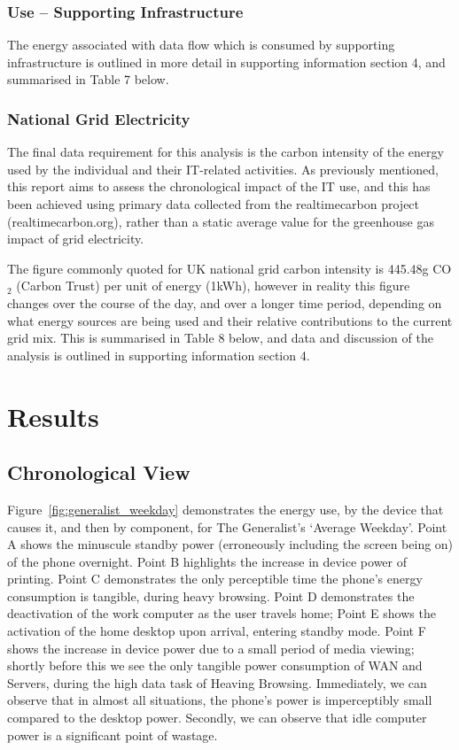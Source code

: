 \documentclass[conference]{IEEEtran}
\begin{document}
\subsubsection{Use -- Supporting Infrastructure}

The energy associated with data flow which is consumed by supporting
infrastructure is outlined in more detail in supporting information
section 4, and summarised in Table 7 below.

\subsubsection{National Grid Electricity}

The final data requirement for this analysis is the carbon intensity
of the energy used by the individual and their IT-related
activities. As previously mentioned, this report aims to assess the
chronological impact of the IT use, and this has been achieved using
primary data collected from the realtimecarbon project
(realtimecarbon.org), rather than a static average value for the
greenhouse gas impact of grid electricity.

The figure commonly quoted for UK national grid carbon intensity is
445.48g CO$_2$ (Carbon Trust) per unit of energy (1kWh), however in
reality this figure changes over the course of the day, and over a
longer time period, depending on what energy sources are being used
and their relative contributions to the current grid mix. This is
summarised in Table 8 below, and data and discussion of the analysis
is outlined in supporting information section 4.


\section{Results}

\subsection{Chronological View}

Figure~\ref{fig:generalist_weekday} demonstrates the energy use, by
the device that causes it, and then by component, for The Generalist’s
`Average Weekday'. Point A shows the minuscule standby power
(erroneously including the screen being on) of the phone
overnight. Point B highlights the increase in device power of
printing. Point C demonstrates the only perceptible time the phone’s
energy consumption is tangible, during heavy browsing. Point D
demonstrates the deactivation of the work computer as the user travels
home; Point E shows the activation of the home desktop upon arrival,
entering standby mode. Point F shows the increase in device power due
to a small period of media viewing; shortly before this we see the
only tangible power consumption of WAN and Servers, during the high
data task of Heaving Browsing.  Immediately, we can observe that in
almost all situations, the phone’s power is imperceptibly small
compared to the desktop power. Secondly, we can observe that idle
computer power is a significant point of wastage.
\end{document}
